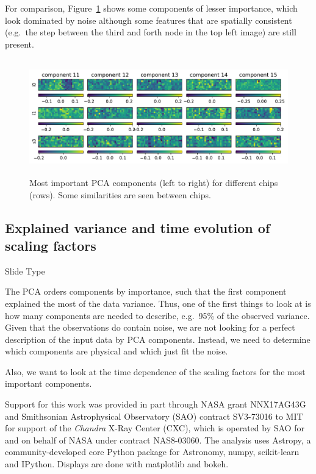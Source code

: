 \documentclass[]{spie}  %
\begin{document}
For comparison, Figure~\ref{fig:components_minor} shows some components of lesser importance, which look dominated by noise although some features that are spatially consistent (e.g.\ the step between the third and forth node in the top left image) are still present.

\begin{figure} [ht]
  \begin{center}
    \includegraphics[height=5cm]{figures/components_minor.pdf}
  \end{center}
  \caption
      {Most important PCA components (left to right) for different chips (rows). Some similarities are seen between chips. \label{fig:components_minor}}
\end{figure}

\subsection{Explained variance and time evolution of scaling factors}
Slide Type

The PCA orders components by importance, such that the first component explained the most of the data variance. Thus, one of the first things to look at is how many components are needed to describe, e.g.\ 95\% of the observed variance. Given that the observations do contain noise, we are not looking for a perfect description of the input data by PCA components. Instead, we need to determine which components are physical and which just fit the noise.

Also, we want to look at the time dependence of the scaling factors for the most important components.


\acknowledgments
Support
for this work was provided in part through NASA grant NNX17AG43G and
Smithsonian Astrophysical Observatory (SAO) contract SV3-73016 to MIT
for support of the {\em Chandra} X-Ray Center (CXC), which is operated
by SAO for and on behalf of NASA under contract NAS8-03060.
The
analysis uses Astropy, a community-developed core Python
package for Astronomy\cite{astropy1,astropy2}, numpy\cite{numpy}, scikit-learn\cite{scikit-learn} and
IPython\cite{IPython}. Displays are done with
matplotlib\cite{matplotlib} and bokeh\cite{bokeh}.

\end{document}
